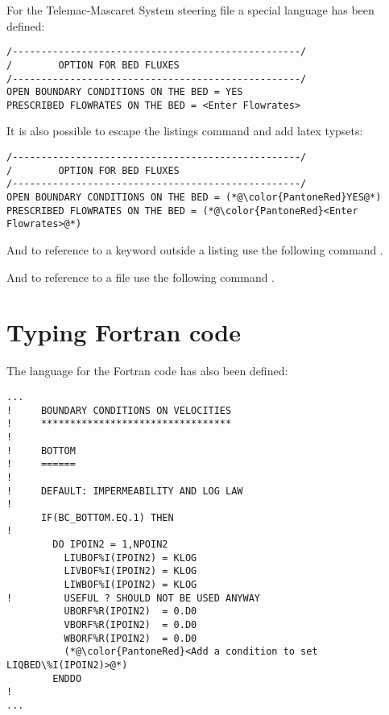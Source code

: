For the Telemac-Mascaret System steering file a special language has been
defined: 

\lstset{language=TelemacCas,
        basicstyle=\scriptsize\ttfamily}

\begin{lstlisting}[frame=trBL]
/--------------------------------------------------/
/        OPTION FOR BED FLUXES
/--------------------------------------------------/
OPEN BOUNDARY CONDITIONS ON THE BED = YES
PRESCRIBED FLOWRATES ON THE BED = <Enter Flowrates>
\end{lstlisting}

It is also possible to escape the listings command and add latex typsets:

\begin{lstlisting}[frame=trBL]
/--------------------------------------------------/
/        OPTION FOR BED FLUXES
/--------------------------------------------------/
OPEN BOUNDARY CONDITIONS ON THE BED = (*@\color{PantoneRed}YES@*)
PRESCRIBED FLOWRATES ON THE BED = (*@\color{PantoneRed}<Enter Flowrates>@*)
\end{lstlisting}


And to reference to a keyword outside a listing use the following command
.

And to reference to a file use the following command .
         
\section{Typing Fortran code}

The language for the Fortran code has also been defined:

\lstset{language=Fortran,
        basicstyle=\scriptsize\ttfamily}

\begin{lstlisting}[frame=trBL]
...
!     BOUNDARY CONDITIONS ON VELOCITIES
!     *********************************
!
!     BOTTOM
!     ======
!
!     DEFAULT: IMPERMEABILITY AND LOG LAW 
!
      IF(BC_BOTTOM.EQ.1) THEN
!
        DO IPOIN2 = 1,NPOIN2
          LIUBOF%I(IPOIN2) = KLOG
          LIVBOF%I(IPOIN2) = KLOG
          LIWBOF%I(IPOIN2) = KLOG
!         USEFUL ? SHOULD NOT BE USED ANYWAY
          UBORF%R(IPOIN2)  = 0.D0
          VBORF%R(IPOIN2)  = 0.D0
          WBORF%R(IPOIN2)  = 0.D0
          (*@\color{PantoneRed}<Add a condition to set LIQBED\%I(IPOIN2)>@*)
        ENDDO
!
...
\end{lstlisting}

